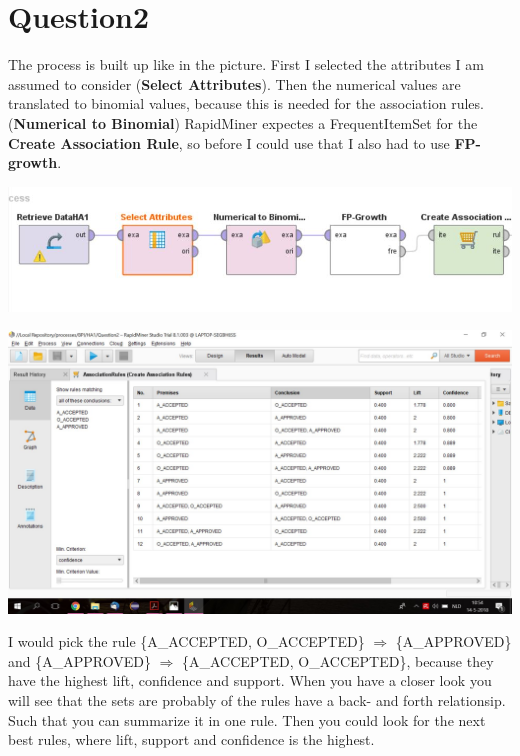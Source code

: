 \section*{Question2}
The process is built up like in the picture. First I selected the attributes I
am assumed to consider (\textbf{Select Attributes}). Then the numerical values
are translated to binomial values, because this is needed for the association
rules. (\textbf{Numerical to Binomial}) RapidMiner expectes a FrequentItemSet
for the \textbf{Create Association Rule}, so before I could use that I also had
to use \textbf{FP-growth}.

\includegraphics[width=\textwidth]{Question2Process.jpg}

\includegraphics[width=\textwidth]{Question2Rapid.jpg}

I would pick the rule \{A\_ACCEPTED, O\_ACCEPTED\} $\Rightarrow$	\{A\_APPROVED\}
and \{A\_APPROVED\} $\Rightarrow$	\{A\_ACCEPTED, O\_ACCEPTED\}, because they
have the highest lift, confidence and support. When you have a closer look you
will see that the sets are probably of the rules have a back- and forth
relationsip. Such that you can summarize it in one rule. Then you could look for
the next best rules, where lift, support and confidence is the highest.
